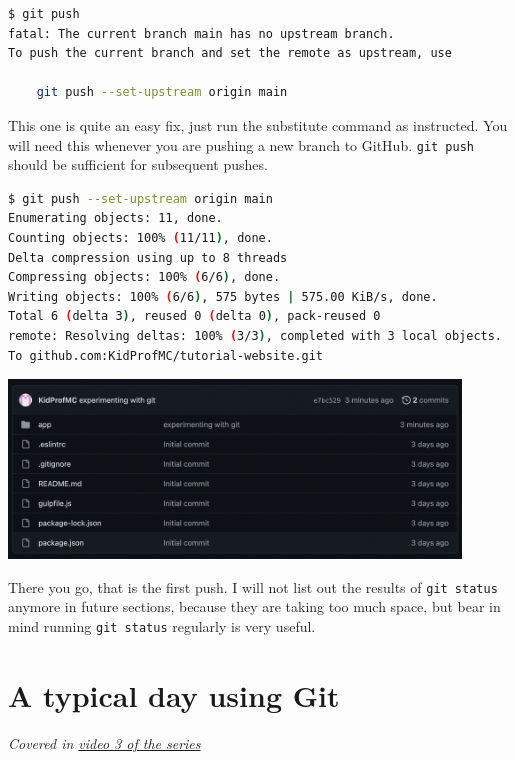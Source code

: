 \begin{lstlisting}[language=bash]
$ git push
fatal: The current branch main has no upstream branch.
To push the current branch and set the remote as upstream, use

    git push --set-upstream origin main
\end{lstlisting}

This one is quite an easy fix, just run the substitute command as instructed. You will need this whenever you are pushing a new branch to GitHub. \texttt{git push} should be sufficient for subsequent pushes.

\begin{lstlisting}[language=bash]
$ git push --set-upstream origin main
Enumerating objects: 11, done.
Counting objects: 100% (11/11), done.
Delta compression using up to 8 threads
Compressing objects: 100% (6/6), done.
Writing objects: 100% (6/6), 575 bytes | 575.00 KiB/s, done.
Total 6 (delta 3), reused 0 (delta 0), pack-reused 0
remote: Resolving deltas: 100% (3/3), completed with 3 local objects.
To github.com:KidProfMC/tutorial-website.git
\end{lstlisting}

\begin{center}
\includegraphics[width=12cm]{images/ch3-firstpushsuccess.png}
\end{center}

There you go, that is the first push. I will not list out the results of \texttt{git status} anymore in future sections, because they are taking too much space, but bear in mind running \texttt{git status} regularly is very useful.

\section{A typical day using Git}
\label{sec:gcmsg}

\textit{Covered in \href{https://www.youtube.com/watch?v=wQmFz-Ggxuo&list=PLjGmdnqrOKuYXiu7lgG5HW71jPEUd1XCm&index=4}{video 3 of the series}}
\vspace{6mm}

